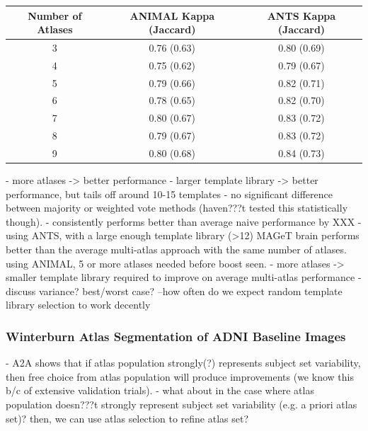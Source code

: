 \documentclass{article}\usepackage{graphicx, color}
\makeatletter
\newenvironment{kframe}{%
 \def\at@end@of@kframe{}%
 \ifinner\ifhmode%
  \def\at@end@of@kframe{\end{minipage}}%
  \begin{minipage}{\columnwidth}%
 \fi\fi%
 \def\FrameCommand##1{\hskip\@totalleftmargin \hskip-\fboxsep
 \colorbox{shadecolor}{##1}\hskip-\fboxsep
     \hskip-\linewidth \hskip-\@totalleftmargin \hskip\columnwidth}%
 \MakeFramed {\advance\hsize-\width
   \@totalleftmargin\z@ \linewidth\hsize
   \@setminipage}}%
 {\par\unskip\endMakeFramed%
 \at@end@of@kframe}
\newcommand{\todo}[1]{\begin{kframe}{\textcolor{red}{TODO #1}}\end{kframe}}
\makeatother
\begin{document}
\begin{table}
    \begin{tabular}{c|c|c}
        Number of Atlases & ANIMAL Kappa (Jaccard) & ANTS Kappa (Jaccard) \\ \hline
        3                 & 0.76 (0.63)             & 0.80 (0.69)          \\ 
        4                 & 0.75 (0.62)             & 0.79 (0.67)          \\ 
        5                 & 0.79 (0.66)             & 0.82 (0.71)          \\ 
        6                 & 0.78 (0.65)             & 0.82 (0.70)          \\ 
        7                 & 0.80 (0.67)             & 0.83 (0.72)          \\ 
        8                 & 0.79 (0.67)             & 0.83 (0.72)          \\ 
        9                 & 0.80 (0.68)             & 0.84 (0.73)          \\
    \end{tabular}
\end{table}

- more atlases -> better performance
- larger template library -> better performance, but tails off around 10-15 templates
- no significant difference between majority or weighted vote methods (haven???t tested this statistically though). 
- consistently performs better than average naive performance by XXX
- using ANTS, with a large enough template library (>12) MAGeT brain performs
  better than the average multi-atlas approach with the same number of atlases.
  using ANIMAL, 5 or more atlases needed before boost seen. 
- more atlases -> smaller template library required to improve on average multi-atlas performance
- discuss variance?  best/worst case? --how often do we expect random template library selection to work decently

\todo{cost (in registrations) / benefit trade off graph:  show number of registrations per Kappa?  or hours of manual labour per Kappa?)}

\subsubsection{Winterburn Atlas Segmentation of ADNI Baseline Images}

- A2A shows that if atlas population strongly(?) represents subject set
  variability, then free choice from atlas population will produce improvements
(we know this b/c of extensive validation trials). 
- what about in the case where atlas population doesn???t strongly represent
  subject set variability (e.g. a priori atlas set)?  then, we can use atlas
selection to refine atlas set? 
\end{document}
